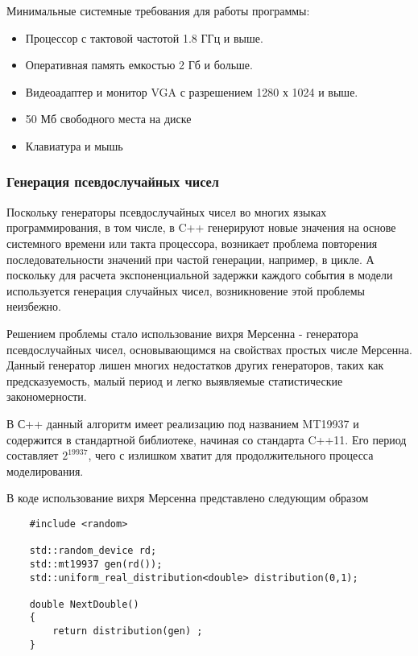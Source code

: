 Минимальные системные требования для работы программы:
\begin{itemize}
	\item Процессор с тактовой частотой 1.8 ГГц и выше.
	\item Оперативная память емкостью 2 Гб и больше.
	\item Видеоадаптер и монитор VGA с разрешением 1280 х 1024 и выше.
	\item 50 Мб свободного места на диске
	\item Клавиатура и мышь
	\end{itemize}

\subsubsection{Генерация псевдослучайных чисел}
Поскольку генераторы псевдослучайных чисел во многих языках программирования, в том числе, в C++ генерируют новые значения на основе системного времени или такта процессора, возникает проблема повторения последовательности значений при частой генерации, например, в цикле. А поскольку для расчета экспоненциальной задержки каждого события в модели используется генерация случайных чисел, возникновение этой проблемы неизбежно.

Решением проблемы стало использование вихря Мерсенна - генератора псевдослучайных чисел, основывающимся на свойствах простых числе Мерсенна. Данный генератор лишен многих недостатков других генераторов, таких как предсказуемость, малый период и легко выявляемые статистические закономерности.

В С++ данный алгоритм имеет реализацию под названием MT19937 и содержится в стандартной библиотеке, начиная со стандарта C++11. Его период составляет $2^19937$, чего с излишком хватит для продолжительного процесса моделирования. 

В коде использование вихря Мерсенна представлено следующим образом
\begin{lstlisting}
	#include <random>
	
	std::random_device rd;
	std::mt19937 gen(rd());
	std::uniform_real_distribution<double> distribution(0,1);
	
	double NextDouble()
	{
		return distribution(gen) ;
	}
\end{lstlisting}

